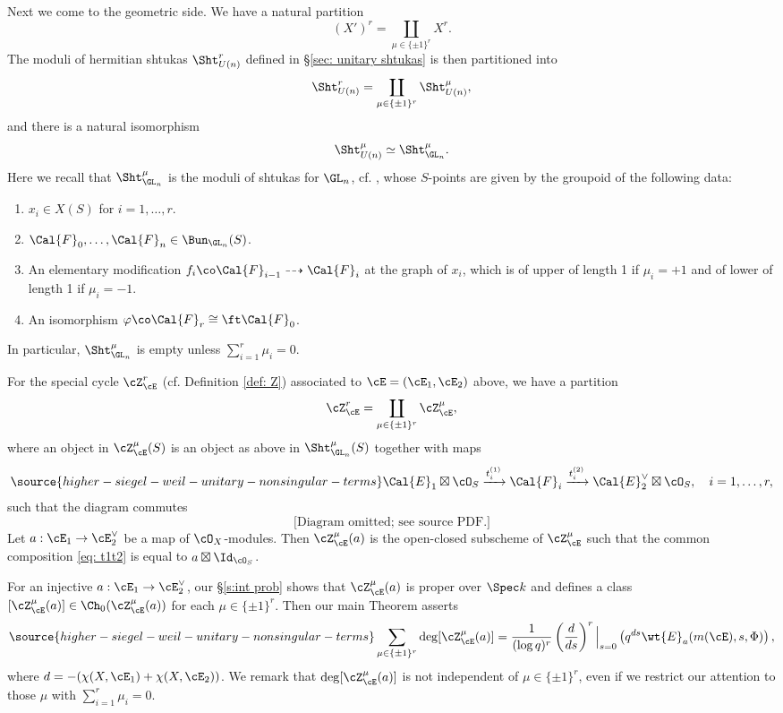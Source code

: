 Next we come to the geometric side. We have a natural partition
$$
(X')^r=\coprod_{\mu\in \{\pm 1\}^r} X^r.
$$
The moduli of hermitian shtukas $\Sht_{U(n)}^r$ defined in \S\ref{sec: unitary shtukas} is then partitioned into
$$
\Sht_{U(n)}^r=\coprod_{\mu\in \{\pm 1\}^r} \Sht_{U(n)}^{\mu},
$$
and there is a natural isomorphism
$$
 \Sht_{U(n)}^{\mu}\simeq \Sht_{\GL_n}^{\mu}.
$$
Here we recall that $ \Sht_{\GL_n}^{\mu}$ is the moduli of shtukas for $\GL_{n}$, cf. \cite{YZ}, whose
$S$-points are given by the groupoid of the following data:
\begin{enumerate}
\item $x_i \in X(S)$ for $i = 1, \ldots, r$.
\item  $\Cal{F}_0, \ldots, \Cal{F}_n\in \Bun_{\GL_n} ( S)$.
\item  An elementary modification $f_i \co \Cal{F}_{i-1} \dashrightarrow
 \Cal{F}_i$ at the graph of $x_i$, which is of upper of length 1 if $\mu_i=+1$ and of lower of length 1 if $\mu_i=-1$.%

\item An isomorphism $\varphi \co \Cal{F}_r \cong \ft \Cal{F}_0$.
\end{enumerate}
In particular, $\Sht_{\GL_n}^{\mu}$ is empty unless $\sum_{i=1}^r \mu_i=0$.


For the special cycle $\cZ_\cE^r $ (cf. Definition \ref{def: Z}) associated to $\cE=(\cE_1,\cE_2)$ above, we have a partition
$$
\cZ_\cE^r =\coprod_{\mu\in \{\pm 1\}^r} \cZ^\mu_\cE,
$$
where an object in $\cZ^\mu_\cE(S)$ is an object as above in $ \Sht_{\GL_n}^{\mu}(S)$ together with maps
\begin{equation}\label{eq: t1t2}
\source{higher-siegel-weil-unitary-nonsingular-terms}
\Cal{E} _1\boxtimes \cO_S \xrightarrow{t_i^{(1)}} \Cal{F}_i  \xrightarrow{t_i^{(2)}}  \Cal{E}_2^{\vee} \boxtimes \cO_S,\quad i = 1, \ldots, r,
\end{equation}
 such that the diagram commutes
\[
\text{[Diagram omitted; see source PDF.]}
\]
Let $a:\cE_1\to\cE_2^\vee$ be a map of $\cO_X$-modules.  Then $\cZ^\mu_\cE(a)$ is the open-closed subscheme of $\cZ^\mu_\cE$ such that the common composition \eqref{eq: t1t2} is equal to $a \boxtimes \Id_{\cO_S} $.


For an injective $a:\cE_1\to\cE_2^\vee$, our \S\ref{s:int prob} shows that $\cZ_{\cE}^\mu(a)$ is proper over $\Spec k$ and  defines a class $[\cZ_{\cE}^\mu(a)]\in \Ch_0( \cZ_{\cE}^\mu(a))$ for each $\mu\in \{\pm 1\}^r$.  Then our main Theorem asserts
\begin{equation}\label{eq: SWF spl}
\source{higher-siegel-weil-unitary-nonsingular-terms}
\sum_{\mu\in \{\pm 1\}^r} \deg [\cZ_{\cE}^\mu(a)] = \frac{1}{(\log q)^r}  \left(\frac{d}{ds}\right)^r\Big|_{s=0}  \left( q^{ds} \wt{E}_{a}(m(\cE),s,\Phi) \right),
\end{equation}
where $d=-(\chi(X,\cE_1)+\chi(X,\cE_2))$. We remark that $\deg [\cZ_{\cE}^\mu(a)]$ is not independent of $\mu \in \{\pm 1\}^r$, even if we restrict our attention to those $\mu$ with $\sum_{i=1}^r \mu_i = 0$.
